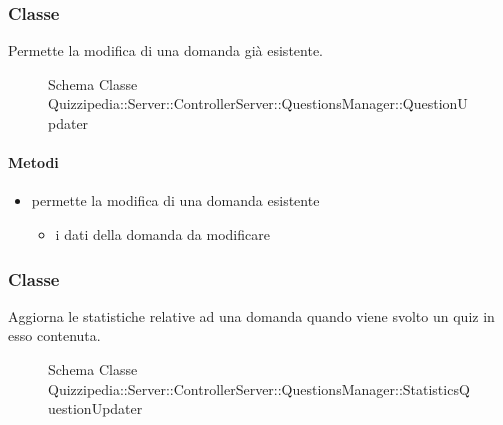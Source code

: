 \subsubsection{Classe }
Permette la modifica di una domanda già esistente.
\begin{figure}[H]
\centering
\noindent{}
\caption[Schema Classe QuestionUpdater]{Schema Classe Quizzipedia::Server::ControllerServer::QuestionsManager::QuestionUpdater}
\end{figure}
\paragraph{Metodi}
\begin{itemize}
\item {}
\newline
permette la modifica di una domanda esistente
\newline
{}
\newline
\begin{itemize}
\item {}
\newline
i dati della domanda da modificare
\end{itemize}
\end{itemize}
\subsubsection{Classe }
Aggiorna le statistiche relative ad una domanda quando viene svolto un quiz in esso contenuta.
\begin{figure}[H]
\centering
\noindent{}
\caption[Schema Classe StatisticsQuestionUpdater]{Schema Classe Quizzipedia::Server::ControllerServer::QuestionsManager::StatisticsQuestionUpdater}
\end{figure}
